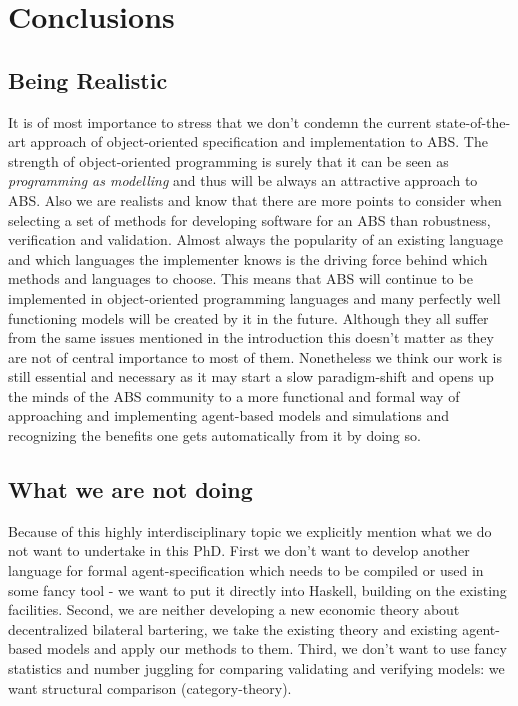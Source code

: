 \chapter{Conclusions}
\label{chap:concl}

\section{Being Realistic}
It is of most importance to stress that we don't condemn the current state-of-the-art approach of object-oriented specification and implementation to ABS. The strength of object-oriented programming is surely that it can be seen as \textit{programming as modelling} and thus will be always an attractive approach to ABS. Also we are realists and know that there are more points to consider when selecting a set of methods for developing software for an ABS than robustness, verification and validation. Almost always the popularity of an existing language and which languages the implementer knows is the driving force behind which methods and languages to choose. This means that ABS will continue to be implemented in object-oriented programming languages and many perfectly well functioning models will be created by it in the future. Although they all suffer from the same issues mentioned in the introduction this doesn't matter as they are not of central importance to most of them.
Nonetheless we think our work is still essential and necessary as it may start a slow paradigm-shift and opens up the minds of the ABS community to a more functional and formal way of approaching and implementing agent-based models and simulations and recognizing the benefits one gets automatically from it by doing so.

\section{What we are not doing}
Because of this highly interdisciplinary topic we explicitly mention what we do not want to undertake in this PhD.
First we don't want to develop another language for formal agent-specification which needs to be compiled or used in some fancy tool - we want to put it directly into Haskell, building on the existing facilities.
Second, we are neither developing a new economic theory about decentralized bilateral bartering, we take the existing theory and existing agent-based models and apply our methods to them.
Third, we don't want to use fancy statistics and number juggling for comparing validating and verifying models: we want structural comparison (category-theory).